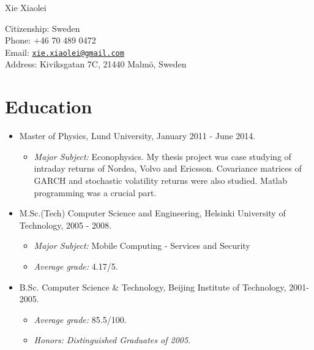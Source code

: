 \documentclass[10pt,letterpaper]{article}
\def\name{Xie Xiaolei}
\begin{document}
{\huge \name}


\vspace{0.25in}

\begin{minipage}[t]{0.5\textwidth}
  Citizenship: Sweden \\
  Phone: +46 70 489 0472 \\
  Email: \href{mailto:xie.xiaolei@gmail.com}{\tt xie.xiaolei@gmail.com} \\
  Address: Kiviksgatan 7C, 21440 Malm\"{o}, Sweden
\end{minipage}

\section*{Education}
\begin{itemize}
\item Master of Physics, Lund University, January 2011 - June 2014.
  \begin{itemize}
  \item {\it Major Subject:} Econophysics. My thesis project was
    case studying of intraday returns of Nordea, Volvo and
    Ericsson. Covariance matrices of GARCH and stochastic volatility
    returns were also studied. Matlab programming was a crucial part.
  \end{itemize}
\item M.Sc.(Tech) Computer Science and Engineering, Helsinki
  University of Technology, 2005 - 2008.
  \begin{itemize}
  \item {\it Major Subject:} Mobile Computing - Services and Security
  \item {\it Average grade:} 4.17/5.
  \end{itemize}
\item B.Sc. Computer Science \& Technology, Beijing Institute of
  Technology, 2001- 2005.
  \begin{itemize}
  \item {\it Average grade:} 85.5/100.
  \item {\it Honors:} \textit{Distinguished Graduates of 2005}.
  \end{itemize}
\end{itemize}
\end{document}

